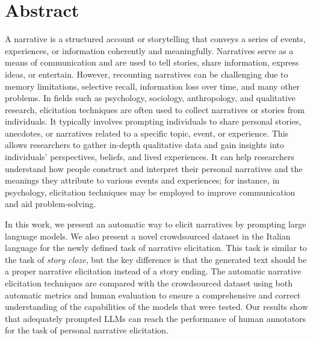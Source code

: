 \chapter*{Abstract} %
\label{abtract}


    A narrative is a structured account or storytelling that conveys a series of events, experiences, or information coherently and meaningfully. Narratives serve as a means of communication and are used to tell stories, share information, express ideas, or entertain. However, recounting narratives can be challenging due to memory limitations, selective recall, information loss over time, and many other problems. In fields such as psychology, sociology, anthropology, and qualitative research, elicitation techniques are often used to collect narratives or stories from individuals. It typically involves prompting individuals to share personal stories, anecdotes, or narratives related to a specific topic, event, or experience. This allows researchers to gather in-depth qualitative data and gain insights into individuals' perspectives, beliefs, and lived experiences. It can help researchers understand how people construct and interpret their personal narratives and the meanings they attribute to various events and experiences; for instance, in psychology, elicitation techniques may be employed to improve communication and aid problem-solving.

In this work, we present an automatic way to elicit narratives by prompting large language models. We also present a novel crowdsourced dataset in the Italian language for the newly defined task of narrative elicitation. This task is similar to the task of \emph{story cloze}, but the key difference is that the generated text should be a proper narrative elicitation instead of a story ending. The automatic narrative elicitation techniques are compared with the crowdsourced dataset using both automatic metrics and human evaluation to ensure a comprehensive and correct understanding of the capabilities of the models that were tested. Our results show that adequately prompted LLMs can reach the performance of human annotators for the task of personal narrative elicitation.



